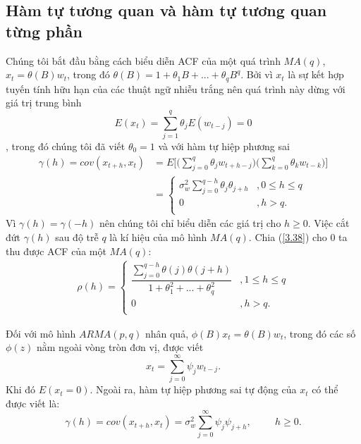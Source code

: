 \documentclass[12pt, a4paper,oneside]{book}
\theoremstyle{definition}
\begin{document}
\subsection{\label{acfpacf}Hàm tự tương quan và hàm tự tương quan từng phần}
Chúng tôi bắt đầu bằng cách biểu diễn ACF của một quá trình $MA(q)$, $x_{t}=\theta(B)w_{t}$, trong đó $\theta(B)=1+\theta_{1}B+...+\theta_{q}B^{q}$. Bởi vì $x_{t}$ là sự kết hợp tuyến tính hữu hạn của các thuật ngữ nhiễu trắng nên quá trình này dừng với giá trị trung bình 
$$E(x_{t})= \displaystyle\sum_{j=1}^q \theta_{j}E(w_{t-j})=0$$,
trong đó chúng tôi đã viết $\theta_{0}=1$ và với hàm tự hiệp phương sai
\begin{align}
	\gamma(h)= cov (x_{t+h},x_{t}) & = E\Bigg[\bigg(\displaystyle\sum_{j=0}^{q} \theta_{j}w_{t+h-j}\bigg)\bigg(\displaystyle\sum_{k=0}^{q} \theta_{k}w_{t-k}\bigg)\Bigg]\\	
	&=\begin{cases} 
	\sigma_w^{2}\displaystyle\sum_{j=0}^{q-h}\theta_{j}\theta_{j+h}&, 0\leq h\leq q \\
    0&, h>q. \\ \label{3.38}
	\end{cases}
\end{align}
Vì $\gamma(h)=\gamma(-h)$ nên chúng tôi chỉ biểu diễn các giá trị cho $h\geq 0$. Việc cắt đứt $\gamma(h)$ sau độ trễ $q$ là kí hiệu của mô hình $MA(q)$. Chia (\ref{3.38}) cho $0$ ta thu được ACF của một $MA(q)$:
\begin{align}
\rho(h) =
\begin{cases} 
\displaystyle\dfrac{\displaystyle\sum_{j=0}^{q-h}\theta(j)\theta(j+h)}{1+\theta_1^{2}+...+\theta_q^{2}}&, 1 \leq h \leq q\\ 
0&, h > q.\\
\end{cases}
\label{ct3.39}
\end{align}

Đối với mô hình $ARMA(p,q)$ nhân quả, $\phi(B)x_{t}=\theta(B)w_{t}$, trong đó các số $\phi(z)$ nằm ngoài vòng tròn đơn vị, được viết
\begin{equation}
x_{t}=\displaystyle\sum_{j=0}^{\infty}\psi_{j}w_{t-j}. \label{ct1.122}
\end{equation}
Khi đó $E(x_{t}=0)$. Ngoài ra, hàm tự hiệp phương sai tự động của $x_{t}$ có thể được viết là:
\begin{equation}
\gamma(h)= cov (x_{t+h},x_{t})= \sigma_w^{2}\displaystyle\sum_{j=0}^{\infty}\psi_{j}\psi_{j+h}, \hspace{1cm} h \geq 0. \label{ct1.123}
\end{equation}
\end{document}
